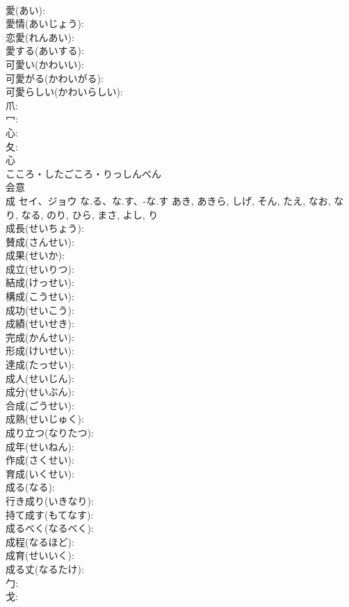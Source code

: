 \documentclass[8pt]{extreport}
\begin{document}
\begin{CJK}{UTF8}{min}
\\	愛(あい): 
\\	愛情(あいじょう): 
\\	恋愛(れんあい): 
\\	愛する(あいする): 
\\	可愛い(かわいい): 
\\	可愛がる(かわいがる): 
\\	可愛らしい(かわいらしい): 
\\	爪: 
\\	冖: 
\\	心: 
\\	夂: 
\\	心	
\\	こころ・したごころ・りっしんべん	
\\	会意 
\\	成	セイ、ジョウ	な.る、な.す、-な.す	あき, あきら, しげ, そん, たえ, なお, なり, なる, のり, ひら, まさ, よし, り	
\\	成長(せいちょう): 
\\	賛成(さんせい): 
\\	成果(せいか): 
\\	成立(せいりつ): 
\\	結成(けっせい): 
\\	構成(こうせい): 
\\	成功(せいこう): 
\\	成績(せいせき): 
\\	完成(かんせい): 
\\	形成(けいせい): 
\\	達成(たっせい): 
\\	成人(せいじん): 
\\	成分(せいぶん): 
\\	合成(ごうせい): 
\\	成熟(せいじゅく): 
\\	成り立つ(なりたつ): 
\\	成年(せいねん): 
\\	作成(さくせい): 
\\	育成(いくせい): 
\\	成る(なる): 
\\	行き成り(いきなり): 
\\	持て成す(もてなす): 
\\	成るべく(なるべく): 
\\	成程(なるほど): 
\\	成育(せいいく): 
\\	成る丈(なるたけ): 
\\	勹: 
\\	戈: 

\end{CJK}
\end{document}
